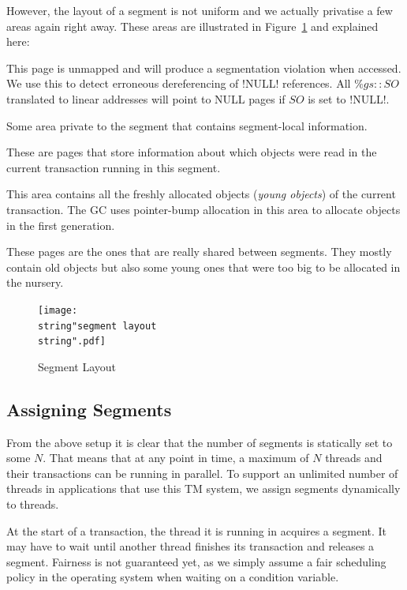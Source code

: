 \documentclass{sigplanconf}
\makeatletter
\renewcommand\lstinline[1][]{%
  \Collectverb{\@@myverb}%
}
\def\@@myverb#1{%
    \begingroup
    \fboxsep=0.2em
    \colorbox{verylightgray}{\oldlstinline|#1|}%
    \endgroup
}
\makeatother
\begin{document}
However, the layout of a segment is not uniform and we actually
privatise a few areas again right away. These areas are illustrated in
Figure~\ref{fig:Segment-Layout} and explained here:
\begin{description}[noitemsep]
\item [{NULL~page:}] This page is unmapped and will produce a
  segmentation violation when accessed. We use this to detect
  erroneous dereferencing of \lstinline!NULL! references.  All
  $\%gs{::}SO$ translated to linear addresses will point to NULL pages
  if $SO$ is set to \lstinline!NULL!.
\item [{Segment-local~data:}] Some area private to the segment that
  contains segment-local information.
\item [{Read~markers:}] These are pages that store information about
  which objects were read in the current transaction running in this
  segment.
\item [{Nursery:}] This area contains all the freshly allocated
  objects (\emph{young objects}) of the current transaction. The GC
  uses pointer-bump allocation in this area to allocate objects in the
  first generation.
\item [{Old~object~space:}] These pages are the ones that are really
  shared between segments. They mostly contain old objects but also
  some young ones that were too big to be allocated in the nursery.
\end{description}


\begin{figure}[t]
  \centering
  \texttt{[image: \\string"segment layout\\string".pdf]}
  \caption{Segment Layout\label{fig:Segment-Layout}}
\end{figure}



\subsection{Assigning Segments}

From the above setup it is clear that the number of segments is
statically set to some $N$. That means that at any point in time, a
maximum of $N$ threads and their transactions can be running in
parallel.  To support an unlimited number of threads in applications
that use this TM system, we assign segments dynamically to threads.

At the start of a transaction, the thread it is running in acquires a
segment. It may have to wait until another thread finishes its
transaction and releases a segment. Fairness is not guaranteed yet, as
we simply assume a fair scheduling policy in the operating system when
waiting on a condition variable.
\end{document}
